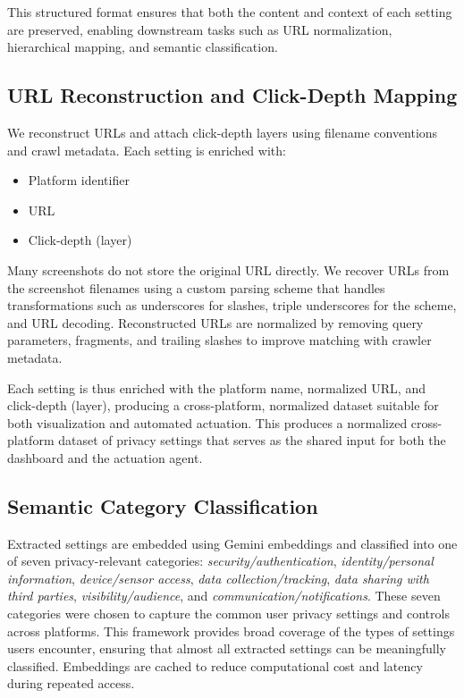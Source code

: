 \documentclass[12pt,letterpaper]{article}
\begin{document}
    This structured format ensures that both the content and context of each setting are preserved, enabling downstream tasks such as URL normalization, hierarchical mapping, and semantic classification.
    
    
    \subsection{URL Reconstruction and Click-Depth Mapping}
    
    We reconstruct URLs and attach click-depth layers using filename conventions and crawl metadata. Each setting is enriched with:
    
    \begin{itemize}
        \item Platform identifier
        \item URL
        \item Click-depth (layer)
    \end{itemize}

    Many screenshots do not store the original URL directly. We recover URLs from the screenshot filenames using a custom parsing scheme that handles transformations such as underscores for slashes, triple underscores for the scheme, and URL decoding. Reconstructed URLs are normalized by removing query parameters, fragments, and trailing slashes to improve matching with crawler metadata.  

    Each setting is thus enriched with the platform name, normalized URL, and click-depth (layer), producing a cross-platform, normalized dataset suitable for both visualization and automated actuation. This produces a normalized cross-platform dataset of privacy settings that serves as the shared input for both the dashboard and the actuation agent.
    
    \subsection{Semantic Category Classification}
    
    Extracted settings are embedded using Gemini embeddings and classified into one of seven privacy-relevant categories: \textit{security/authentication}, \textit{identity/personal information}, \textit{device/sensor access}, \textit{data collection/tracking}, \textit{data sharing with third parties}, \textit{visibility/audience}, and \textit{communication/notifications}. These seven categories were chosen to capture the common user privacy settings and controls across platforms. This framework provides broad coverage of the types of settings users encounter, ensuring that almost all extracted settings can be meaningfully classified. Embeddings are cached to reduce computational cost and latency during repeated access.  
\end{document}

